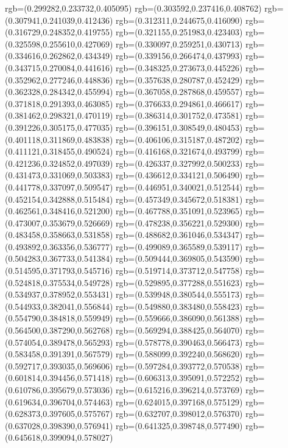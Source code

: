 {{{			rgb=(0.299282,0.233732,0.405095)
			rgb=(0.303592,0.237416,0.408762)
			rgb=(0.307941,0.241039,0.412436)
			rgb=(0.312311,0.244675,0.416090)
			rgb=(0.316729,0.248352,0.419755)
			rgb=(0.321155,0.251983,0.423403)
			rgb=(0.325598,0.255610,0.427069)
			rgb=(0.330097,0.259251,0.430713)
			rgb=(0.334616,0.262862,0.434349)
			rgb=(0.339156,0.266474,0.437993)
			rgb=(0.343715,0.270084,0.441616)
			rgb=(0.348325,0.273673,0.445226)
			rgb=(0.352962,0.277246,0.448836)
			rgb=(0.357638,0.280787,0.452429)
			rgb=(0.362328,0.284342,0.455994)
			rgb=(0.367058,0.287868,0.459557)
			rgb=(0.371818,0.291393,0.463085)
			rgb=(0.376633,0.294861,0.466617)
			rgb=(0.381462,0.298321,0.470119)
			rgb=(0.386314,0.301752,0.473581)
			rgb=(0.391226,0.305175,0.477035)
			rgb=(0.396151,0.308549,0.480453)
			rgb=(0.401118,0.311869,0.483838)
			rgb=(0.406106,0.315187,0.487202)
			rgb=(0.411121,0.318455,0.490524)
			rgb=(0.416168,0.321674,0.493799)
			rgb=(0.421236,0.324852,0.497039)
			rgb=(0.426337,0.327992,0.500233)
			rgb=(0.431473,0.331069,0.503383)
			rgb=(0.436612,0.334121,0.506490)
			rgb=(0.441778,0.337097,0.509547)
			rgb=(0.446951,0.340021,0.512544)
			rgb=(0.452154,0.342888,0.515484)
			rgb=(0.457349,0.345672,0.518381)
			rgb=(0.462561,0.348416,0.521200)
			rgb=(0.467788,0.351091,0.523965)
			rgb=(0.473007,0.353679,0.526669)
			rgb=(0.478238,0.356221,0.529300)
			rgb=(0.483458,0.358663,0.531858)
			rgb=(0.488682,0.361046,0.534347)
			rgb=(0.493892,0.363356,0.536777)
			rgb=(0.499089,0.365589,0.539117)
			rgb=(0.504283,0.367733,0.541384)
			rgb=(0.509444,0.369805,0.543590)
			rgb=(0.514595,0.371793,0.545716)
			rgb=(0.519714,0.373712,0.547758)
			rgb=(0.524818,0.375534,0.549728)
			rgb=(0.529895,0.377288,0.551623)
			rgb=(0.534937,0.378952,0.553431)
			rgb=(0.539948,0.380544,0.555173)
			rgb=(0.544933,0.382041,0.556844)
			rgb=(0.549880,0.383480,0.558423)
			rgb=(0.554790,0.384818,0.559949)
			rgb=(0.559666,0.386090,0.561388)
			rgb=(0.564500,0.387290,0.562768)
			rgb=(0.569294,0.388425,0.564070)
			rgb=(0.574054,0.389478,0.565293)
			rgb=(0.578778,0.390463,0.566473)
			rgb=(0.583458,0.391391,0.567579)
			rgb=(0.588099,0.392240,0.568620)
			rgb=(0.592717,0.393035,0.569606)
			rgb=(0.597284,0.393772,0.570538)
			rgb=(0.601814,0.394456,0.571418)
			rgb=(0.606313,0.395091,0.572252)
			rgb=(0.610786,0.395679,0.573036)
			rgb=(0.615216,0.396214,0.573769)
			rgb=(0.619634,0.396704,0.574463)
			rgb=(0.624015,0.397168,0.575129)
			rgb=(0.628373,0.397605,0.575767)
			rgb=(0.632707,0.398012,0.576370)
			rgb=(0.637028,0.398390,0.576941)
			rgb=(0.641325,0.398748,0.577490)
			rgb=(0.645618,0.399094,0.578027)
}}}
